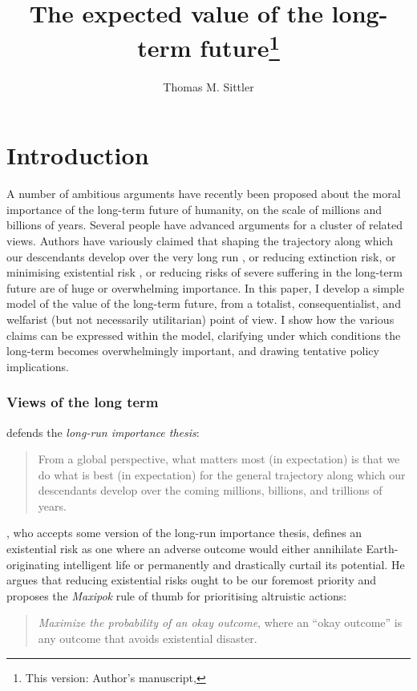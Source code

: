\documentclass[british]{article}
\title{The expected value of the long-term future\footnote{This version: Author's manuscript, \DTMnow}}
\date{}
\author{Thomas M. Sittler}
\begin{document}
\maketitle

\section{Introduction}
A number of ambitious arguments have recently been proposed about the moral importance of the long-term future of humanity, on the scale of millions and billions of years. Several people have advanced arguments for a cluster of related views. Authors have variously claimed that shaping the trajectory along which our descendants develop over the very long run \citep{beckstead_overwhelming_2013-2}, or reducing extinction risk, or minimising existential risk \citep{bostrom_existential_2002}, or reducing risks of severe suffering in the long-term future \citep{althaus_reducing_2016} are of huge or overwhelming importance. In this paper, I develop a simple model of the value of the long-term future, from a totalist, consequentialist, and welfarist (but not necessarily utilitarian) point of view. I show how the various claims can be expressed within the model, clarifying under which conditions the long-term becomes overwhelmingly important, and drawing tentative policy implications. 

\subsubsection*{Views of the long term}\label{claims}
\cite{beckstead_overwhelming_2013-2} defends the \emph{long-run importance thesis}:
\begin{quote}
From a global perspective, what matters most (in
expectation) is that we do what is best (in expectation) for the general
trajectory along which our descendants develop over the coming millions,
billions, and trillions of years.
\end{quote}

\cite{bostrom_existential_2002}, who accepts some version of the long-run importance thesis, defines an existential risk as one where an adverse outcome would either annihilate Earth-originating
intelligent life or permanently and drastically curtail its potential. He argues that reducing existential risks ought to be our foremost priority and proposes the \emph{Maxipok} rule of thumb for prioritising altruistic actions: 
\begin{quote}
\emph{Maximize the probability of an okay outcome}, where an ``okay
outcome'' is any outcome that avoids existential disaster.
\end{quote}
\end{document}
